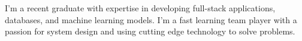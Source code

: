 \documentclass[letter,10pt]{article}
\begin{document}
\def\introstatement{I'm a recent graduate with expertise in developing full-stack applications, databases, and machine learning models. I'm a fast learning team player with a passion for system design and using cutting edge technology to solve problems.}


\begin{flushleft}
    \introstatement{}
\end{flushleft}
\end{document}
